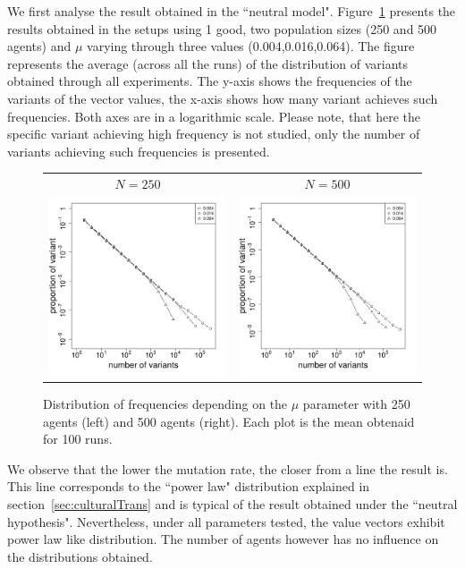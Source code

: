\documentclass{wscpaperproc}
\begin{document}
We first analyse the result obtained in the ``neutral model". Figure~\ref{fig:allMutation} presents the results obtained in the setups using 1 good, two population sizes (250 and 500 agents) and $\mu$ varying through three values (0.004,0.016,0.064). The figure represents the average (across all the runs) of the distribution of variants obtained through all experiments. The y-axis shows the frequencies of the variants of the vector values, the x-axis shows how many variant achieves such frequencies. Both axes are in a logarithmic scale. Please note, that here the specific variant achieving high frequency is not studied, only the number of variants achieving such frequencies is presented.

\begin{figure}[h]
	\centering
	\begin{tabular}{ c c}
		 $N=250$ & $N=500$ \\
		\includegraphics[width=6cm]{img/allmuRandMaxN250.pdf}&
		\includegraphics[width=6cm]{img/allmuRandMaxN500.pdf}
	\end{tabular}
	\caption{Distribution of frequencies depending on the $\mu$ parameter with 250 agents (left) and 500 agents (right). Each plot is the mean obtenaid for 100 runs.\label{fig:allMutation}}
\end{figure}

We observe that the lower the mutation rate, the closer from a line the result is. This line corresponds to the ``power law" distribution explained in section~\ref{sec:culturalTrans} and is typical of the result obtained under the ``neutral hypothesis". Nevertheless, under all parameters tested, the value vectors exhibit power law like distribution. The number of agents however has no influence on the distributions obtained.
\end{document}
